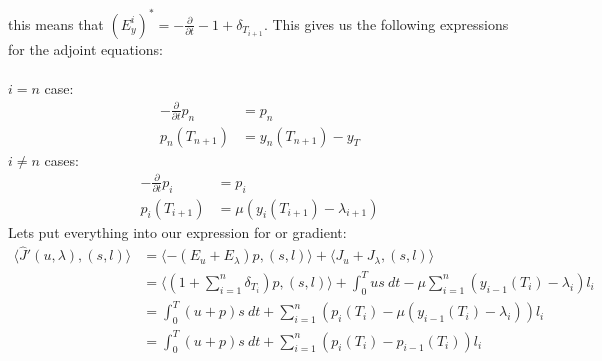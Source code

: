 \documentclass[11pt,a4paper]{report}
\begin{document}
this means that $(E_y^i)^*=-\frac{\partial }{\partial t}-1 + \delta_{T_{i+1}}$. This gives us the following expressions for the adjoint equations:
\\
\\
$i=n$ case:
\begin{align*}
-\frac{\partial }{\partial t}p_n &=p_n  \\
p_n(T_{n+1}) &= y_n(T_{n+1})-y_T
\end{align*}
$i\neq n$ cases:
\begin{align*}
-\frac{\partial }{\partial t}p_i &=p_i  \\
p_i(T_{i+1}) &= \mu(y_{i}(T_{i+1})-\lambda_{i+1} )
\end{align*}
Lets put everything into our expression for or gradient:
\begin{align*}
\langle \hat{J}'(u,\lambda), (s,l)\rangle&=\langle -(E_u+E_{\lambda})p, (s,l)\rangle + \langle J_u+J_{\lambda}, (s,l)\rangle \\
&= \langle (1+\sum_{i=1}^n \delta_{T_i})p , (s,l)\rangle+ \int_0^T us \ dt - \mu \sum_{i=1}^{n}(y_{i-1}(T_i)-\lambda_i)l_i\\
&=\int_0^T (u+p)s \ dt +\sum_{i=1}^n(p_{i}(T_i) -\mu(y_{i-1}(T_i)-\lambda_i) )l_i \\
&= \int_0^T (u+p)s \ dt +\sum_{i=1}^n(p_{i}(T_i) -p_{i-1}(T_i) )l_i
\end{align*} 
\end{document}
